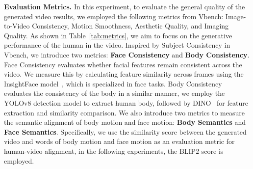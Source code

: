 \begin{table}[th!] 
  \centering
  \vspace{-3 mm}
  \caption{Quantitative comparison between the baseline and the proposed extended diffusion transformer network further pretrained on the proposed 6.05K hours dataset. }
  \vspace{-6 mm}
  \label{tab:action_compare}
\end{table}




\noindent\textbf{Evaluation Metrics.}
In this experiment, to evaluate the general quality of the generated video results, we employed the following metrics from Vbench: Image-to-Video Consistency, Motion Smoothness, Aesthetic Quality, and Imaging Quality. 
As shown in Table~\ref{tab:metrics}, we aim to focus on the generative performance of the human in the video. Inspired by Subject Consistency in Vbench, we introduce two metrics: \textbf{Face Consistency} and \textbf{Body Consistency}. Face Consistency evaluates whether facial features remain consistent across the video. We measure this by calculating feature similarity across frames using the InsightFace model~\cite{Deng2020CVPR}, which is specialized in face tasks. Body Consistency evaluates the consistency of the body in a similar manner, we employ the YOLOv8 detection model to extract human body, followed by DINO~\cite{caron2021emerging} for feature extraction and similarity comparison.
We also introduce two metrics to measure the semantic alignment of body motion and face motion: \textbf{Body Semantics} and \textbf{Face Semantics}. Specifically, we use the similarity score between the generated video and words of body motion and face motion as an evaluation metric for human-video alignment, in the following experiments, the BLIP2 score is employed.






